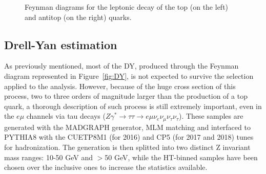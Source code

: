 \documentclass[a4paper, 10pt, openright]{report}
\begin{document}
\begin{figure}[htbp]
\centering
\begin{minipage}[b]{.34\textwidth}
\end{minipage} 
\begin{minipage}[b]{.34\textwidth}
\end{minipage} 
\caption{Feynman diagrams for the leptonic decay of the top (on the left) and antitop (on the right) quarks.}
\label{fig:TopDecay}
\end{figure}

\subsection{Drell-Yan estimation} \label{subsection:DY}

As previously mentioned, most of the \ac{DY}, produced through the Feynman diagram represented in Figure~\ref{fig:DY}, is not expected to survive the selection applied to the analysis. However, because of the huge cross section of this process, two to three orders of magnitude larger than the production of a top quark, a thorough description of such process is still extremely important, even in the $e \mu$ channels via tau decays ($Z \gamma^{*} \rightarrow \tau \tau \rightarrow e \mu \nu_e \nu_\mu \nu_\tau \nu_\tau$). These samples are generated with the MADGRAPH generator, MLM matching and interfaced to PYTHIA8 with the CUETP8M1 (for 2016) and CP5 (for 2017 and 2018) tunes for hadronization. The generation is then splitted into two distinct Z invariant mass ranges: 10-50 GeV and $>$50 GeV, while the HT-binned samples have been chosen over the inclusive ones to increase the statistics available.
\end{document}
